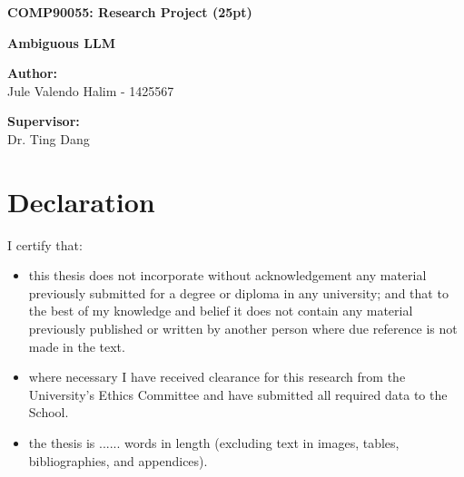 \documentclass[review]{elsarticle}
\begin{document}
\begin{frontmatter}


\begin{titlepage}
\begin{center}
\vspace*{1cm}

\textbf{ \large COMP90055: Research Project (25pt)}

\textbf{ \large Ambiguous LLM}
\vspace{1.5cm}

\textbf{Author:} \\
Jule Valendo Halim - 1425567 \\

\hspace{10pt}

\small  

\begin{comment}
Clearly indicate who will handle correspondence at all stages of refereeing and publication, also post-publication. Ensure that phone numbers (with country and area code) are provided in addition to the e-mail address and the complete postal address. Contact details must be kept up to date by the corresponding author.
\end{comment}

\vspace{1cm}
\textbf{Supervisor:} \\
Dr. Ting Dang \\
      
\end{center}
\end{titlepage}
\section*{Declaration}

I certify that:
\begin{itemize}
    \item this thesis does not incorporate without acknowledgement any material previously submitted for a degree or diploma in any university; and that to the best of my knowledge and belief it does not contain any material previously published or written by another person where due reference is not made in the text.
    \item where necessary I have received clearance for this research from the University's Ethics Committee and have submitted all required data to the School.
    \item the thesis is ...... words in length (excluding text in images, tables, bibliographies, and appendices).
\end{itemize}


\end{frontmatter}
\end{document}
